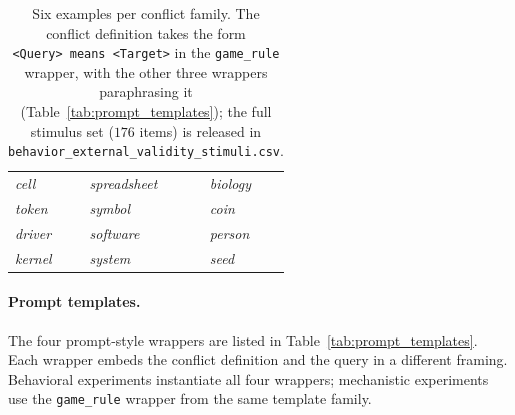\documentclass[11pt]{article}
\begin{document}
\begin{table}[H]
\begin{tabular*}{\columnwidth}{@{\extracolsep{\fill}}lll@{}}
\emph{cell}    & \emph{spreadsheet} & \emph{biology}     \\
\emph{token}   & \emph{symbol}      & \emph{coin}        \\
\emph{driver}  & \emph{software}    & \emph{person}      \\
\emph{kernel}  & \emph{system}      & \emph{seed}        \\
\bottomrule
\end{tabular*}
\caption{Six examples per conflict family. The conflict definition takes the form
\texttt{<Query>~means~<Target>} in the \texttt{game\_rule} wrapper, with the other three
wrappers paraphrasing it (Table~\ref{tab:prompt_templates}); the full stimulus set ($176$
items) is released in \texttt{behavior\_\allowbreak external\_validity\_stimuli.\allowbreak csv}.}
\label{tab:stim_examples}
\end{table}

\paragraph{Prompt templates.}
The four prompt-style wrappers are listed in Table~\ref{tab:prompt_templates}. Each wrapper
embeds the conflict definition and the query in a different framing. Behavioral experiments
instantiate all four wrappers; mechanistic experiments use the \texttt{game\_rule} wrapper from
the same template family.
\end{document}
